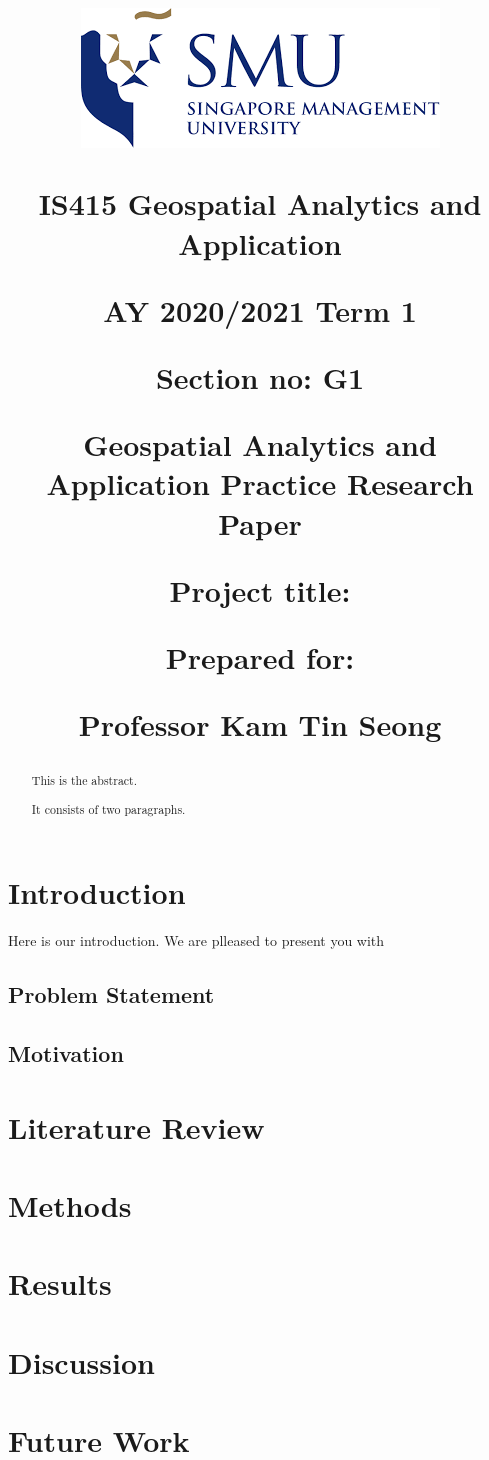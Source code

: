\documentclass{acm_proc_article-sp}
\title{\includegraphics{SMU_logo.png}

IS415 Geospatial Analytics and Application

AY 2020/2021 Term 1

Section no: G1

Geospatial Analytics and Application Practice Research Paper

Project title:

Prepared for:

Professor Kam Tin Seong}
\author{
\alignauthor Erika Aldisa Gunawan \\
        \affaddr{Singapore Management University}\\
       \email{}
\and \alignauthor Lee Jun Hui Sean \\
        \affaddr{National University of Singapore}\\
       \email{}
\and \alignauthor Ng Xun Jie \\
        \affaddr{Singapore Management University}\\
       \email{}
\and }
\date{}
\begin{document}
\maketitle

\begin{abstract}
This is the abstract.

It consists of two paragraphs.
\end{abstract}

\hypertarget{introduction}{%
\section{Introduction}\label{introduction}}

Here is our introduction. We are plleased to present you with

\hypertarget{problem-statement}{%
\subsection{Problem Statement}\label{problem-statement}}

\hypertarget{motivation}{%
\subsection{Motivation}\label{motivation}}

\hypertarget{literature-review}{%
\section{Literature Review}\label{literature-review}}

\hypertarget{methods}{%
\section{Methods}\label{methods}}

\hypertarget{results}{%
\section{Results}\label{results}}

\hypertarget{discussion}{%
\section{Discussion}\label{discussion}}

\hypertarget{future-work}{%
\section{Future Work}\label{future-work}}
\end{document}
